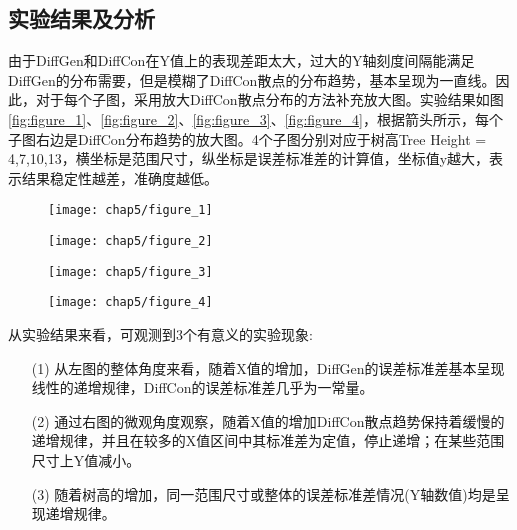\subsection{实验结果及分析}


由于DiffGen和DiffCon在Y值上的表现差距太大，过大的Y轴刻度间隔能满足DiffGen的分布需要，但是模糊了DiffCon散点的分布趋势，基本呈现为一直线。因此，对于每个子图，采用放大DiffCon散点分布的方法补充放大图。实验结果如图\ref{fig:figure_1}、\ref{fig:figure_2}、\ref{fig:figure_3}、\ref{fig:figure_4}，根据箭头所示，每个子图右边是DiffCon分布趋势的放大图。4个子图分别对应于树高Tree Height = 4,7,10,13，横坐标是范围尺寸，纵坐标是误差标准差的计算值，坐标值y越大，表示结果稳定性越差，准确度越低。

\begin{figure}[!htp]
	\centering
	\texttt{[image: chap5/figure\_1]}
\end{figure}

\begin{figure}[!htp]
	\centering
	\texttt{[image: chap5/figure\_2]}
\end{figure}

\begin{figure}[!htp]
	\centering
	\texttt{[image: chap5/figure\_3]}
\end{figure}

\begin{figure}[!htp]
	\centering
	\texttt{[image: chap5/figure\_4]}
\end{figure}

从实验结果来看，可观测到3个有意义的实验现象:
\begin{enumerate}
	\item[(1)]从左图的整体角度来看，随着X值的增加，DiffGen的误差标准差基本呈现线性的递增规律，DiffCon的误差标准差几乎为一常量。
	\item[(2)]通过右图的微观角度观察，随着X值的增加DiffCon散点趋势保持着缓慢的递增规律，并且在较多的X值区间中其标准差为定值，停止递增；在某些范围尺寸上Y值减小。
	\item[(3)]随着树高的增加，同一范围尺寸或整体的误差标准差情况(Y轴数值)均是呈现递增规律。
\end{enumerate}


